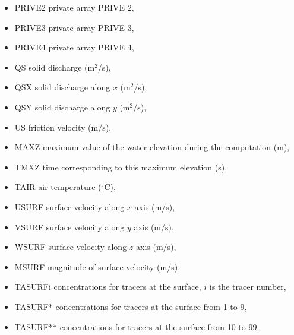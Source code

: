\begin{itemize}
\item PRIVE2 private array PRIVE 2,

\item PRIVE3 private array PRIVE 3,

\item PRIVE4 private array PRIVE 4,

\item QS  solid discharge (m${}^{2}$/s),

\item QSX  solid discharge along $x$ (m${}^{2}$/s),

\item QSY  solid discharge along $y$ (m${}^{2}$/s),

\item US  friction velocity (m/s),

\item MAXZ  maximum value of the water elevation during the computation (m),

\item TMXZ  time corresponding to this maximum elevation (s),








\item TAIR  air temperature ($^{\circ}$C),

\item USURF surface velocity along $x$ axis (m/s),

\item VSURF surface velocity along $y$ axis (m/s),

\item WSURF surface velocity along $z$ axis (m/s),

\item MSURF magnitude of surface velocity (m/s),

\item TASURFi concentrations for tracers at the surface,
$i$ is the tracer number,

\item TASURF* concentrations for tracers at the surface from 1 to 9,

\item TASURF** concentrations for tracers at the surface from 10 to 99.
\end{itemize}


